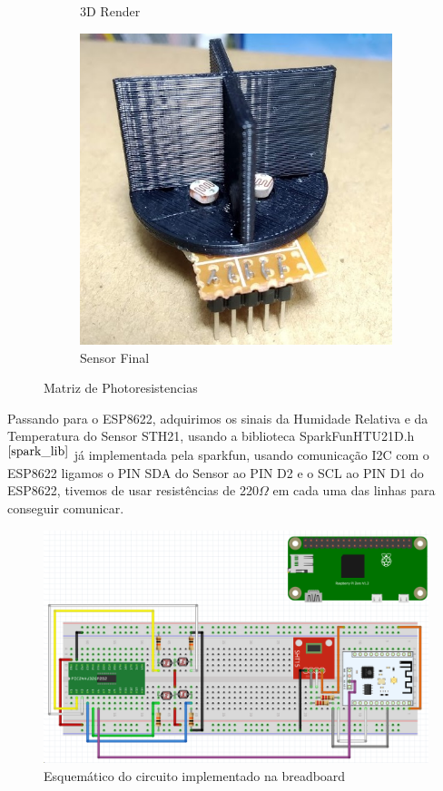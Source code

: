 \documentclass[12pt]{article}
\begin{document}
\begin{figure}[H]
\begin{subfigure}[b]{0.3\linewidth}
    \caption{3D Render}
  \end{subfigure}
  \begin{subfigure}[b]{0.3\linewidth}
    \includegraphics[width=\linewidth]{imgs/LDR_HUB_Foto.jpg}
    \caption{Sensor Final}
  \end{subfigure}
  \caption{Matriz de Photoresistencias}
  \label{fig:LDR_Matrix}
\end{figure}

Passando para o ESP8622, adquirimos os sinais da Humidade Relativa e da Temperatura do Sensor STH21, usando a biblioteca SparkFunHTU21D.h$^{\cite{spark_lib}}$ já implementada pela sparkfun, usando comunicação I2C com o ESP8622 ligamos o PIN SDA do Sensor ao PIN D2 e o SCL ao PIN D1 do ESP8622, tivemos de usar resistências de 220$\Omega$ em cada uma das linhas para conseguir comunicar.

\begin{figure}[H]
        \centering
        \includegraphics[width=0.7\linewidth]{imgs/circuit.png}
        \caption{Esquemático do circuito implementado na breadboard}
        \label{fig:circuit}
\end{figure}
\end{document}
